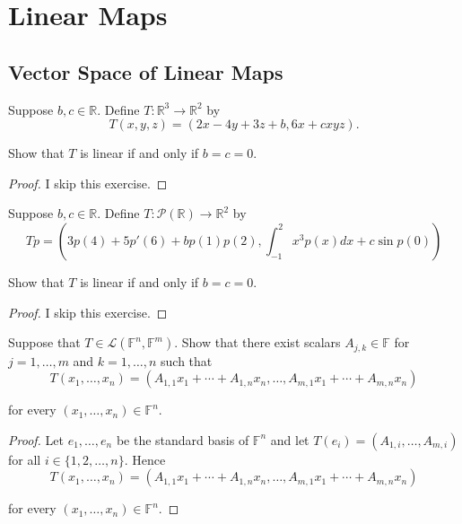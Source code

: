\chapter{Linear Maps}

\section{Vector Space of Linear Maps}

\begin{exercise}
    Suppose $b, c\in\mathbb{R}$. Define $T: \mathbb{R}^{3}\to \mathbb{R}^{2}$ by
    \[
        T(x, y, z) = (2x - 4y + 3z + b, 6x + cxyz).
    \]

    Show that $T$ is linear if and only if $b = c = 0$.
\end{exercise}

\begin{proof}
    I skip this exercise.
\end{proof}
\newpage

\begin{exercise}
    Suppose $b, c \in \mathbb{R}$. Define $T: \mathcal{P}(\mathbb{R})\to \mathbb{R}^{2}$ by
    \[
        Tp = \left( 3p(4) + 5p'(6) + bp(1)p(2), \int^{2}_{-1}x^{3}p(x)dx + c \sin p(0) \right)
    \]

    Show that $T$ is linear if and only if $b = c = 0$.
\end{exercise}

\begin{proof}
    I skip this exercise.
\end{proof}
\newpage

\begin{exercise}
    Suppose that $T\in \mathcal{L}(\mathbb{F}^{n}, \mathbb{F}^{m})$. Show that there exist scalars $A_{j,k}\in\mathbb{F}$ for $j = 1, \ldots, m$ and $k = 1, \ldots, n$ such that
    \[
        T(x_{1}, \ldots, x_{n}) = (A_{1,1}x_{1} + \cdots + A_{1,n}x_{n}, \ldots, A_{m,1}x_{1} + \cdots + A_{m,n}x_{n})
    \]

    for every $(x_{1}, \ldots, x_{n})\in\mathbb{F}^{n}$.
\end{exercise}

\begin{proof}
    Let $e_{1}, \ldots, e_{n}$ be the standard basis of $\mathbb{F}^{n}$ and let $T(e_{i}) = (A_{1,i}, \ldots, A_{m, i})$ for all $i\in\{ 1, 2, \ldots, n \}$. Hence
    \[
        T(x_{1}, \ldots, x_{n}) = (A_{1,1}x_{1} + \cdots + A_{1,n}x_{n}, \ldots, A_{m,1}x_{1} + \cdots + A_{m,n}x_{n})
    \]

    for every $(x_{1}, \ldots, x_{n})\in\mathbb{F}^{n}$.
\end{proof}
\newpage

